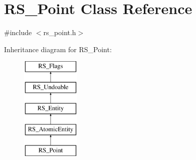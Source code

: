 \hypertarget{classRS__Point}{\section{R\-S\-\_\-\-Point Class Reference}
\label{classRS__Point}
}


{\ttfamily \#include $<$rs\-\_\-point.\-h$>$}

Inheritance diagram for R\-S\-\_\-\-Point\-:\begin{figure}[H]
\begin{center}
\leavevmode
\includegraphics[height=5.000000cm]{classRS__Point}
\end{center}
\end{figure}
